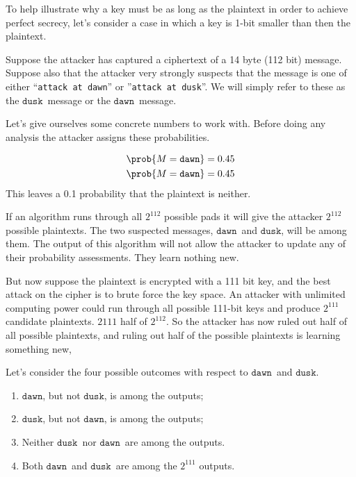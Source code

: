 \documentclass{article}
\newcommand\mdusk{\ensuremath{\mathtt{dusk}}}
\newcommand\mdawn{\ensuremath{\mathtt{dawn}}}
\begin{document}
To help illustrate why a key must be as long as the plaintext in order to achieve perfect secrecy, let's consider a case in which a key is 1-bit smaller than then the plaintext.

Suppose the attacker has captured a ciphertext of a 14 byte (112 bit) message.
Suppose also that the attacker very strongly suspects that the message is one of either “\texttt{attack at dawn}” or ”\texttt{attack at dusk}”.
We will simply refer to these as the \mdusk\ message or the \mdawn\ message.

Let's give ourselves some concrete numbers to work with. Before doing any analysis the attacker assigns these probabilities.

\begin{align*}
    \prob{M = \mdawn} & = 0.45 \\
    \prob{M = \mdawn} & = 0.45 \\
\end{align*}
This leaves a 0.1 probability that the plaintext is neither.

If an algorithm runs through all $2^{112}$ possible pads it will give the attacker $2^{112}$ possible plaintexts.
The two suspected messages, \mdawn\ and \mdusk, will be among them.
The output of this algorithm will not allow the attacker to update any of their probability assessments. They learn nothing new.

But now suppose the plaintext is encrypted with a 111 bit key, and the best attack on the cipher is to brute force the key space.
An attacker with unlimited computing power could run through all possible 111-bit keys and produce $2^{111}$ candidate plaintexts.
$2{111}$ half of $2^{112}$.
So the attacker has now ruled out half of all possible plaintexts,
and ruling out half of the possible plaintexts is learning something new,

Let's consider the four possible outcomes with respect to \mdawn\ and \mdusk.

\begin{enumerate}
    \item\label{en:dawn} \mdawn, but not \mdusk, is among the outputs;
    \item\label{en:dusk} \mdusk, but not \mdawn, is among the outputs;
    \item\label{en:neither} Neither \mdusk\ nor \mdawn\ are among the outputs.
    \item\label{en:both} Both \mdawn\ and \mdusk\ are among the $2^{111}$ outputs.
\end{enumerate}
\end{document}
